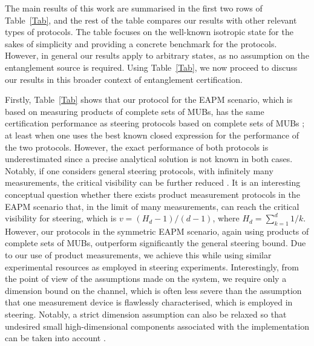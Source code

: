 \documentclass[aps,superscriptaddress,twocolumn,twoside,floatfix,pra,nofootinbib,a4paper]{revtex4-2}
\begin{document}
The main results of this work are summarised in the first two rows of Table~\ref{Tab}, and the rest of the table compares our results with other relevant types of protocols. The table focuses on the well-known isotropic state for the sakes of simplicity and providing a concrete benchmark for the protocols. However, in general our results apply to arbitrary states, as no assumption on the entanglement source is required. Using Table~\ref{Tab}, we now proceed to discuss our results in this broader context of entanglement certification.


Firstly, Table~\ref{Tab} shows that our protocol for the EAPM scenario, which is based on measuring products of complete sets of MUBs, has the same certification performance as steering protocols based on complete sets of MUBs \cite{Marciniak2015, Skrzypczyk2015}; at least when one uses the best known closed expression for the performance of the two protocols. However, the exact performance of both protocols is underestimated since a precise analytical solution is not known in both cases. Notably, if one considers general steering protocols, with infinitely many measurements, the critical visibility can be further reduced \cite{Wiseman2007}. It is an interesting conceptual question whether there exists product measurement protocols in the EAPM scenario that, in the limit of many measurements, can reach the critical  visibility for steering, which is $v=(H_d-1)/(d-1)$, where $H_d=\sum_{k=1}^d 1/k$. However, our protocols in the symmetric EAPM scenario, again using  products of complete sets of MUBs, outperform significantly the general steering bound. Due to our use of product measurements, we achieve this while using similar experimental resources as employed in steering experiments. Interestingly, from the point of view of the assumptions made on the system, we require only a dimension bound on the channel, which is often less severe than the assumption that one measurement device is flawlessly characterised, which is employed in steering. Notably, a strict dimension assumption can also be relaxed so that undesired  small high-dimensional components associated with the implementation can be taken into account \cite{AlmostQudit}. 
	
\end{document}

